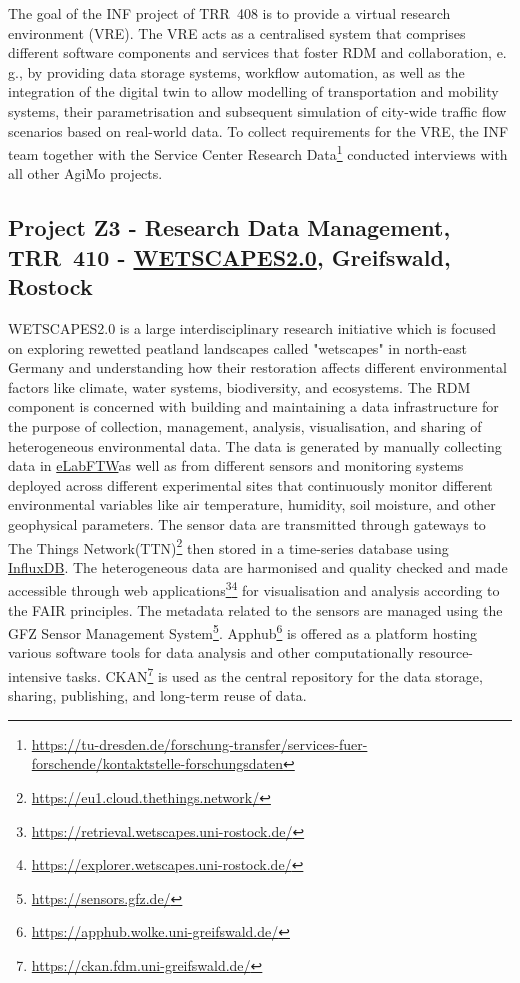 \documentclass{eceasst}
\newcommand{\eg}{e.\,g.}
\newcommand{\elabftw}{\href{https://www.elabftw.net/}{eLabFTW}}
\begin{document}
The goal of the INF project of TRR~408 is to provide a virtual research environment (VRE).
The VRE acts as a centralised system that comprises different software components and services that foster RDM and collaboration, \eg, by providing data storage systems, workflow automation, as well as the integration of the digital twin to allow modelling of transportation and mobility systems, their parametrisation and subsequent simulation of city-wide traffic flow scenarios based on real-world data. To collect requirements for the VRE, the INF team together with the Service Center Research Data\footnote{\url{https://tu-dresden.de/forschung-transfer/services-fuer-forschende/kontaktstelle-forschungsdaten}} conducted interviews with all other AgiMo projects.

\subsection{Project Z3 - Research Data Management, TRR~410 - \href{https://wetscapes2.uni-greifswald.de/}{WETSCAPES2.0}, Greifswald, Rostock}
WETSCAPES2.0 is a large interdisciplinary research initiative which is focused on exploring rewetted peatland landscapes called "wetscapes" in north-east Germany and understanding how their restoration affects different environmental factors like climate, water systems, biodiversity, and ecosystems.
The RDM component is concerned with building and maintaining a data infrastructure for the purpose of collection, management, analysis, visualisation, and sharing of heterogeneous environmental data.
The data is generated by manually collecting data in \elabftw as well as from different sensors and monitoring systems deployed across different experimental sites that continuously monitor different environmental variables like air temperature, humidity, soil moisture, and other geophysical parameters.
The sensor data are transmitted through gateways to The Things Network(TTN)\footnote{\url{https://eu1.cloud.thethings.network/}} then stored in a time-series database using \href{https://www.influxdata.com/}{InfluxDB}.
The heterogeneous data are harmonised and quality checked and made accessible through web applications\footnote{\url{https://retrieval.wetscapes.uni-rostock.de/}}\footnote{\url{https://explorer.wetscapes.uni-rostock.de/}} for visualisation and analysis according to the FAIR principles.
The metadata related to the sensors are managed using the GFZ Sensor Management System\footnote{\url{https://sensors.gfz.de/}}. Apphub\footnote{\url{https://apphub.wolke.uni-greifswald.de/}} is offered as a platform hosting various software tools for data analysis and other computationally resource-intensive tasks.
CKAN\footnote{\url{https://ckan.fdm.uni-greifswald.de/}} is used as the central repository for the data storage, sharing, publishing, and long-term reuse of data.
\end{document}
